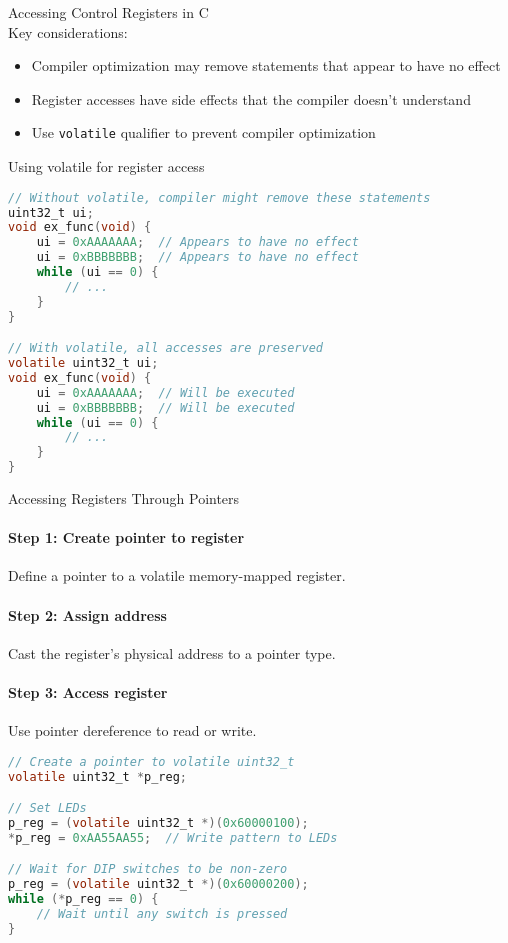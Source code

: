 \begin{concept}{Accessing Control Registers in C}\\
Key considerations:
\begin{itemize}
    \item Compiler optimization may remove statements that appear to have no effect
    \item Register accesses have side effects that the compiler doesn't understand
    \item Use \texttt{volatile} qualifier to prevent compiler optimization
\end{itemize}
\end{concept}

\begin{code}{Using volatile for register access}
\begin{lstlisting}[language=C, style=basesmol]
// Without volatile, compiler might remove these statements
uint32_t ui;
void ex_func(void) {
    ui = 0xAAAAAAA;  // Appears to have no effect
    ui = 0xBBBBBBB;  // Appears to have no effect
    while (ui == 0) {
        // ...
    }
}

// With volatile, all accesses are preserved
volatile uint32_t ui;
void ex_func(void) {
    ui = 0xAAAAAAA;  // Will be executed
    ui = 0xBBBBBBB;  // Will be executed
    while (ui == 0) {
        // ...
    }
}
\end{lstlisting}
\end{code}

\begin{KR}{Accessing Registers Through Pointers}
\paragraph{Step 1: Create pointer to register}
Define a pointer to a volatile memory-mapped register.
\paragraph{Step 2: Assign address}
Cast the register's physical address to a pointer type.
\paragraph{Step 3: Access register}
Use pointer dereference to read or write.

\begin{lstlisting}[language=C, style=basesmol]
// Create a pointer to volatile uint32_t
volatile uint32_t *p_reg;

// Set LEDs
p_reg = (volatile uint32_t *)(0x60000100);
*p_reg = 0xAA55AA55;  // Write pattern to LEDs

// Wait for DIP switches to be non-zero
p_reg = (volatile uint32_t *)(0x60000200);
while (*p_reg == 0) {
    // Wait until any switch is pressed
}
\end{lstlisting}
\end{KR}

